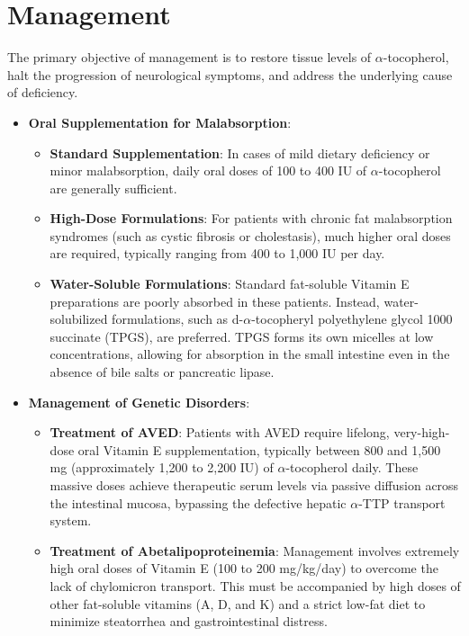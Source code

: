 \section*{Management}
The primary objective of management is to restore tissue levels of $\alpha$-tocopherol, halt the progression of neurological symptoms, and address the underlying cause of deficiency.

\begin{itemize}
    \item \textbf{Oral Supplementation for Malabsorption}:
    \begin{itemize}
        \item \textbf{Standard Supplementation}: In cases of mild dietary deficiency or minor malabsorption, daily oral doses of 100 to 400 IU of $\alpha$-tocopherol are generally sufficient.
        \item \textbf{High-Dose Formulations}: For patients with chronic fat malabsorption syndromes (such as cystic fibrosis or cholestasis), much higher oral doses are required, typically ranging from 400 to 1,000 IU per day.
        \item \textbf{Water-Soluble Formulations}: Standard fat-soluble Vitamin E preparations are poorly absorbed in these patients. Instead, water-solubilized formulations, such as d-$\alpha$-tocopheryl polyethylene glycol 1000 succinate (TPGS), are preferred. TPGS forms its own micelles at low concentrations, allowing for absorption in the small intestine even in the absence of bile salts or pancreatic lipase.
    \end{itemize}
    \item \textbf{Management of Genetic Disorders}:
    \begin{itemize}
        \item \textbf{Treatment of AVED}: Patients with AVED require lifelong, very-high-dose oral Vitamin E supplementation, typically between 800 and 1,500 mg (approximately 1,200 to 2,200 IU) of $\alpha$-tocopherol daily. These massive doses achieve therapeutic serum levels via passive diffusion across the intestinal mucosa, bypassing the defective hepatic $\alpha$-TTP transport system.
        \item \textbf{Treatment of Abetalipoproteinemia}: Management involves extremely high oral doses of Vitamin E (100 to 200 mg/kg/day) to overcome the lack of chylomicron transport. This must be accompanied by high doses of other fat-soluble vitamins (A, D, and K) and a strict low-fat diet to minimize steatorrhea and gastrointestinal distress.

\end{itemize}
\end{itemize}
